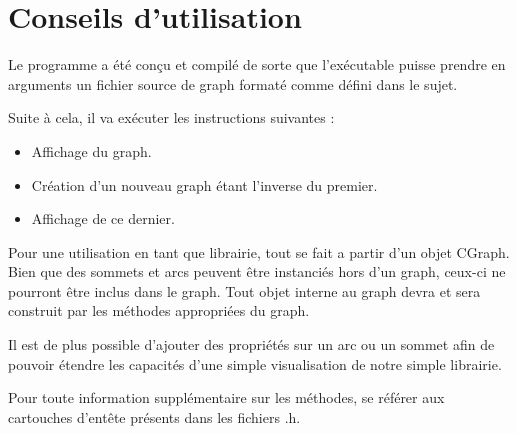 	\chapter{Conseils d'utilisation}
	Le programme a été conçu et compilé de sorte que l'exécutable puisse prendre en arguments un fichier source de graph formaté comme défini dans le sujet.
	
	Suite à cela, il va exécuter les instructions suivantes :
	\begin{itemize}
		\item Affichage du graph.
		\item Création d'un nouveau graph étant l'inverse du premier.
		\item Affichage de ce dernier. \\
	\end{itemize}
	Pour une utilisation en tant que librairie, tout se fait a partir d'un objet CGraph. Bien que des sommets et arcs peuvent être instanciés hors d'un graph, ceux-ci ne pourront être inclus dans le graph. Tout objet interne au graph devra et sera construit par les méthodes appropriées du graph.
	
	Il est de plus possible d'ajouter des propriétés sur un arc ou un sommet afin de pouvoir étendre les capacités d'une simple visualisation de notre simple librairie.

	Pour toute information supplémentaire sur les méthodes, se référer aux cartouches d'entête présents dans les fichiers .h.

